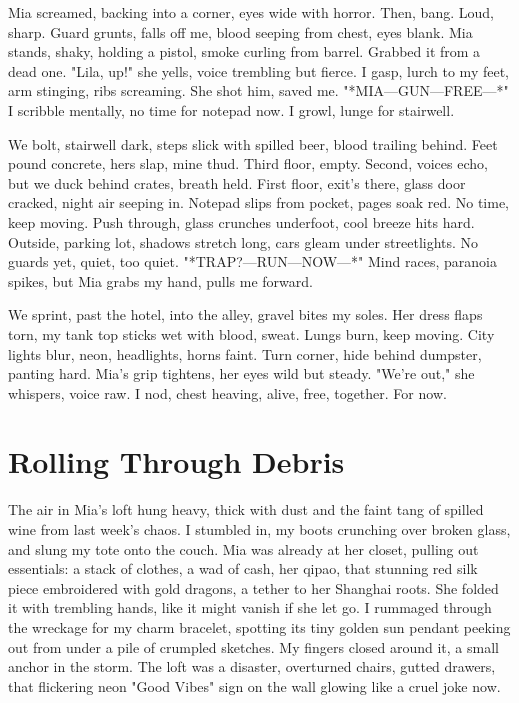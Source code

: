 \documentclass{article}
\begin{document}
Mia screamed, backing into a corner, eyes wide with horror. Then, bang. Loud, sharp. Guard grunts, falls off me, blood seeping from chest, eyes blank. Mia stands, shaky, holding a pistol, smoke curling from barrel. Grabbed it from a dead one. "Lila, up!" she yells, voice trembling but fierce. I gasp, lurch to my feet, arm stinging, ribs screaming. She shot him, saved me. "*MIA—GUN—FREE—*" I scribble mentally, no time for notepad now. I growl, lunge for stairwell.

We bolt, stairwell dark, steps slick with spilled beer, blood trailing behind. Feet pound concrete, hers slap, mine thud. Third floor, empty. Second, voices echo, but we duck behind crates, breath held. First floor, exit's there, glass door cracked, night air seeping in. Notepad slips from pocket, pages soak red. No time, keep moving. Push through, glass crunches underfoot, cool breeze hits hard. Outside, parking lot, shadows stretch long, cars gleam under streetlights. No guards yet, quiet, too quiet. "*TRAP?—RUN—NOW—*" Mind races, paranoia spikes, but Mia grabs my hand, pulls me forward.

We sprint, past the hotel, into the alley, gravel bites my soles. Her dress flaps torn, my tank top sticks wet with blood, sweat. Lungs burn, keep moving. City lights blur, neon, headlights, horns faint. Turn corner, hide behind dumpster, panting hard. Mia's grip tightens, her eyes wild but steady. "We're out," she whispers, voice raw. I nod, chest heaving, alive, free, together. For now.

\section{Rolling Through Debris}

The air in Mia's loft hung heavy, thick with dust and the faint tang of spilled wine from last week's chaos. I stumbled in, my boots crunching over broken glass, and slung my tote onto the couch. Mia was already at her closet, pulling out essentials: a stack of clothes, a wad of cash, her qipao, that stunning red silk piece embroidered with gold dragons, a tether to her Shanghai roots. She folded it with trembling hands, like it might vanish if she let go. I rummaged through the wreckage for my charm bracelet, spotting its tiny golden sun pendant peeking out from under a pile of crumpled sketches. My fingers closed around it, a small anchor in the storm. The loft was a disaster, overturned chairs, gutted drawers, that flickering neon "Good Vibes" sign on the wall glowing like a cruel joke now.
\end{document}
